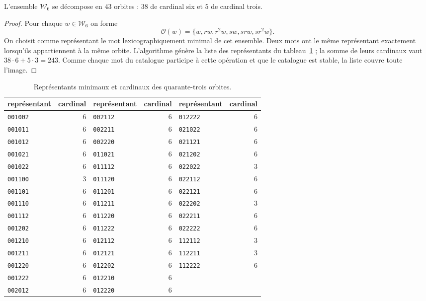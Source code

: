 \begin{proposition}
\label{act21:tpk:43}
L'ensemble \(\mathcal W_6\) se décompose en \(43\) orbites : \(38\)
de cardinal six et \(5\) de cardinal trois.
\end{proposition}
\begin{proof}
Pour chaque \(w\in\mathcal W_6\) on forme
\[
 \mathcal O(w)=\{w,rw,r^2w,sw,srw,sr^2w\}.
\]
On choisit comme représentant le mot lexicographiquement minimal de cet ensemble. Deux mots ont le même représentant exactement lorsqu'ils appartiennent à la même orbite. L'algorithme génère la liste des représentants du tableau~\ref{act21:tpk:representantes} ; la somme de leurs cardinaux vaut \(38\cdot6+5\cdot3=243\). Comme chaque mot du catalogue participe à cette opération et que le catalogue est stable, la liste couvre toute l'image.
\end{proof}

\begin{table}[htbp]
\caption{Représentants minimaux et cardinaux des quarante-trois orbites.}
\label{act21:tpk:representantes}
\small
\begin{tabular}{@{}lr@{\qquad}lr@{\qquad}lr@{}}
\toprule
représentant&cardinal&représentant&cardinal&représentant&cardinal\\
\midrule
\texttt{001002}&6&\texttt{002112}&6&\texttt{012222}&6\\
\texttt{001011}&6&\texttt{002211}&6&\texttt{021022}&6\\
\texttt{001012}&6&\texttt{002220}&6&\texttt{021121}&6\\
\texttt{001021}&6&\texttt{011021}&6&\texttt{021202}&6\\
\texttt{001022}&6&\texttt{011112}&6&\texttt{022022}&3\\
\texttt{001100}&3&\texttt{011120}&6&\texttt{022112}&6\\
\texttt{001101}&6&\texttt{011201}&6&\texttt{022121}&6\\
\texttt{001110}&6&\texttt{011211}&6&\texttt{022202}&3\\
\texttt{001112}&6&\texttt{011220}&6&\texttt{022211}&6\\
\texttt{001202}&6&\texttt{011222}&6&\texttt{022222}&6\\
\texttt{001210}&6&\texttt{012112}&6&\texttt{112112}&3\\
\texttt{001211}&6&\texttt{012121}&6&\texttt{112211}&3\\
\texttt{001220}&6&\texttt{012202}&6&\texttt{112222}&6\\
\texttt{001222}&6&\texttt{012210}&6&&\\
\texttt{002012}&6&\texttt{012220}&6&&\\
\bottomrule
\end{tabular}
\end{table}

